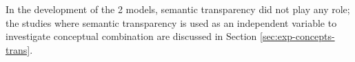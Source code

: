 



In the development of the 2 models, semantic transparency did
not play any role; the studies where semantic transparency is used as
an independent variable to investigate conceptual combination are
discussed in Section \ref{sec:exp-concepts-trans}. 

